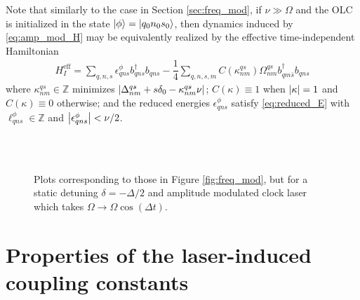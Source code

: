 \documentclass[aps,notitlepage,nofootinbib,11pt]{revtex4-1}
\renewcommand{\t}{\text} %
\newcommand{\f}[2]{\dfrac{#1}{#2}} %
\newcommand{\p}[1]{\left(#1\right)} %
\newcommand{\1}{\mathds{1}}
\newcommand{\Z}{\mathbb Z}
\begin{document}
Note that similarly to the case in Section \ref{sec:freq_mod}, if
$\nu\gg\Omega$ and the OLC is initialized in the state
$\ket\phi=\ket{q_0n_0s_0}$, then dynamics induced by
\eqref{eq:amp_mod_H} may be equivalently realized by the effective
time-independent Hamiltonian
\begin{align}
  H_I^{\t{eff}}
  = \sum_{q,n,s} \epsilon_{qns}^\phi b_{qns}^\dag b_{qns}
  - \f14\sum_{q,n,s,m} C\p{\kappa^{qs}_{nm}} \Omega^{qs}_{nm}
  b_{qm\bar s}^\dag b_{qns}
\end{align}
where $\kappa^{qs}_{nm}\in\Z$ minimizes
$\abs{\Delta^{qs}_{nm}+s\delta_0-\kappa^{qs}_{nm}\nu}$;
$C\p{\kappa}\equiv1$ when $\abs{\kappa}=1$ and $C\p{\kappa}\equiv0$
otherwise; and the reduced energies $\epsilon_{qns}^\phi$ satisfy
\eqref{eq:reduced_E} with $\ell_{qns}^\phi\in\Z$ and
$\abs{\epsilon_{qns}^\phi}<\nu/2$.

\begin{figure}[h!]
  \captionsetup[subfloat]{farskip=1pt,captionskip=1pt}
   
  \\
   
  \\
   
  \caption{Plots corresponding to those in Figure \ref{fig:freq_mod},
    but for a static detuning $\delta=-\Delta/2$ and amplitude
    modulated clock laser which takes
    $\Omega\to\Omega\cos\p{\Delta t}$.}
  \label{fig:amp_mod}
\end{figure}


\newpage
\appendix

\section{Properties of the laser-induced coupling constants}
\label{sec:laser_coupling}
\end{document}
